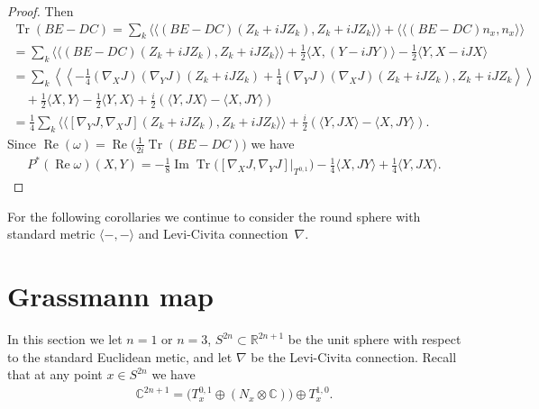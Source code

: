 \documentclass[11pt]{article}
\DeclareMathOperator{\Tr}{Tr}
\numberwithin{equation}{section}
\newcommand{\R}{\mathbb{R}}
\newcommand{\CC}{\mathbb{C}}
\begin{document}
\begin{proof}
Then
\begin{gather*}
\Tr(BE-DC) = \sum_k \langle\langle (BE-DC) (Z_k + i J Z_k), Z_k + i J Z_k \rangle\rangle + \langle\langle (BE-DC)n_x,n_x \rangle\rangle \\
=\sum_k \langle\langle (BE-DC)( Z_k + i J Z_k), Z_k + i J Z_k \rangle\rangle + \frac 1 2 \langle X , (Y - i J Y) \rangle - \frac 1 2 \langle Y , X-iJX \rangle \\
= \sum_k \left\langle\left\langle -\frac{1}{4} (\nabla_X J) (\nabla_Y J)(Z_k + i J Z_k) +
\frac{1}{4} (\nabla_Y J) (\nabla_X J)(Z_k + i J Z_k)
, Z_k + i J Z_k \right\rangle\right\rangle \\
\quad{} + \frac 1 2 \langle X , Y\rangle - \frac 1 2 \langle Y , X \rangle + \frac i 2 ( \langle Y , JX \rangle - \langle X , JY \rangle ) \\
= \frac{1}{4} \sum_k \langle\langle [ \nabla_Y J , \nabla_X J ] (Z_k + i J Z_k)
, Z_k + i J Z_k \rangle\rangle + \frac i 2 ( \langle Y , JX \rangle - \langle X , JY \rangle ) .
\end{gather*}
Since $\operatorname{Re}(\omega) = \operatorname{Re} \big( \frac{1}{2i} \Tr(BE-DC)\big)$ we have
\begin{gather*}
 P^* (\operatorname{Re} \omega ) (X,Y)
= -\frac{1}{8} \operatorname{Im} \Tr \big( [ \nabla_X J , \nabla_Y J ] \big|_{T^{0,1}} \big)
 - \frac 1 4 \langle X,JY \rangle + \frac 1 4 \langle Y,JX \rangle. \tag*{\qed}
 \end{gather*}\renewcommand{\qed}{}
\end{proof}

For the following corollaries we continue to consider the round sphere with standard metric $\langle - ,- \rangle$ and Levi-Civita connection~$\nabla$.


\setcounter{section}{4}
\setcounter{subsection}{0}
\setcounter{subsubsection}{0}
\setcounter{thm}{7}
\setcounter{equation}{1}
\section{Grassmann map} \label{sec;Gmap}

In this section we let $n=1$ or $n=3$, $S^{2n} \subset \R^{2n+1}$ be the unit sphere with respect to the standard Euclidean metic, and let $\nabla$ be the Levi-Civita connection. Recall that at any point $x \in S^{2n}$ we have
\begin{gather*}
\CC^{2n+1} = \big( T^{0,1}_x \oplus (N_x \otimes \CC) \big) \oplus T^{1,0}_x.
\end{gather*}
\end{document}
